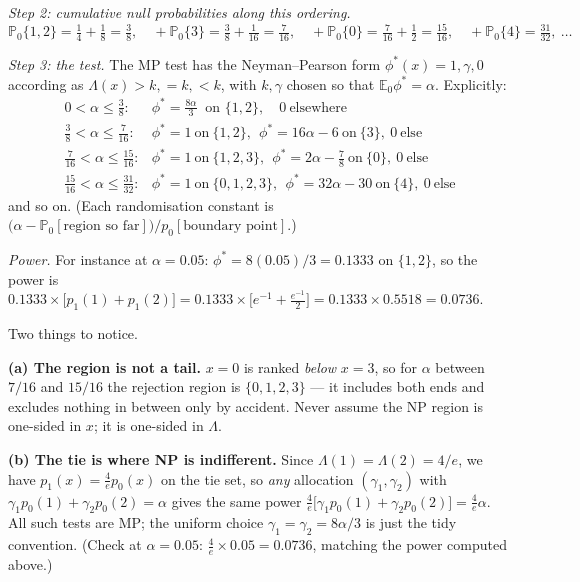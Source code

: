\documentclass[11pt]{article}
\newcommand{\E}{\mathbb{E}}
\newcommand{\Prob}{\mathbb{P}}
\begin{document}
\emph{Step 2: cumulative null probabilities along this ordering.}
\[
\Prob_0\{1,2\}=\tfrac14+\tfrac18=\tfrac38,\quad
+\Prob_0\{3\}=\tfrac38+\tfrac1{16}=\tfrac7{16},\quad
+\Prob_0\{0\}=\tfrac7{16}+\tfrac12=\tfrac{15}{16},\quad
+\Prob_0\{4\}=\tfrac{31}{32},\ \dots
\]

\emph{Step 3: the test.} The MP test has the Neyman--Pearson form
$\phi^*(x)=1,\gamma,0$ according as $\Lambda(x)>k,=k,<k$, with $k,\gamma$ chosen so that
$\E_0\phi^*=\alpha$. Explicitly:
\[
\boxed{
\begin{array}{ll}
0<\alpha\le\tfrac38: & \phi^*=\tfrac{8\alpha}{3}\ \text{ on }\{1,2\},\quad 0\ \text{elsewhere}\\[3pt]
\tfrac38<\alpha\le\tfrac7{16}: & \phi^*=1\ \text{on}\ \{1,2\},\ \ \phi^*=16\alpha-6\ \text{on}\ \{3\},\ 0\ \text{else}\\[3pt]
\tfrac7{16}<\alpha\le\tfrac{15}{16}: & \phi^*=1\ \text{on}\ \{1,2,3\},\ \ \phi^*=2\alpha-\tfrac78\ \text{on}\ \{0\},\ 0\ \text{else}\\[3pt]
\tfrac{15}{16}<\alpha\le\tfrac{31}{32}: & \phi^*=1\ \text{on}\ \{0,1,2,3\},\ \ \phi^*=32\alpha-30\ \text{on}\ \{4\},\ 0\ \text{else}
\end{array}}
\]
and so on. (Each randomisation constant is $\big(\alpha-\Prob_0[\text{region so far}]\big)\big/
p_0[\text{boundary point}]$.)

\emph{Power.} For instance at $\alpha=0.05$: $\phi^*=8(0.05)/3=0.1333$ on $\{1,2\}$, so the
power is $0.1333\times\big[p_1(1)+p_1(2)\big]=0.1333\times\big[e^{-1}+\tfrac{e^{-1}}{2}\big]
=0.1333\times0.5518=0.0736$.

\begin{notebox}
Two things to notice.

\textbf{(a) The region is not a tail.} $x=0$ is ranked \emph{below} $x=3$, so for
$\alpha$ between $7/16$ and $15/16$ the rejection region is $\{0,1,2,3\}$ --- it includes both
ends and excludes nothing in between only by accident. Never assume the NP region is one-sided
in $x$; it is one-sided in $\Lambda$.

\textbf{(b) The tie is where NP is indifferent.} Since $\Lambda(1)=\Lambda(2)=4/e$, we have
$p_1(x)=\tfrac4e p_0(x)$ on the tie set, so \emph{any} allocation $(\gamma_1,\gamma_2)$ with
$\gamma_1 p_0(1)+\gamma_2 p_0(2)=\alpha$ gives the same power
$\tfrac4e\big[\gamma_1p_0(1)+\gamma_2p_0(2)\big]=\tfrac4e\alpha$. All such tests are MP; the
uniform choice $\gamma_1=\gamma_2=8\alpha/3$ is just the tidy convention. (Check at
$\alpha=0.05$: $\tfrac4e\times0.05=0.0736$, matching the power computed above.)
\end{notebox}
\end{document}
